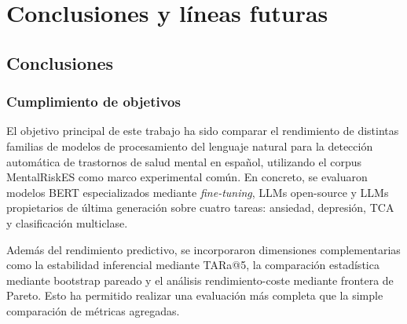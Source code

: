 %
%
%
% 
%
%
%
%

\chapter{Conclusiones y líneas futuras}
\label{cha:concl-y-line}

\section{Conclusiones}

\subsection{Cumplimiento de objetivos}

El objetivo principal de este trabajo ha sido comparar el rendimiento de distintas familias de modelos de procesamiento del lenguaje natural para la detección automática de trastornos de salud mental en español, utilizando el corpus MentalRiskES como marco experimental común. En concreto, se evaluaron modelos BERT especializados mediante \textit{fine-tuning}, LLMs open-source y LLMs propietarios de última generación sobre cuatro tareas: ansiedad, depresión, TCA y clasificación multiclase.

Además del rendimiento predictivo, se incorporaron dimensiones complementarias como la estabilidad inferencial mediante TARa@5, la comparación estadística mediante bootstrap pareado y el análisis rendimiento-coste mediante frontera de Pareto. Esto ha permitido realizar una evaluación más completa que la simple comparación de métricas agregadas.

